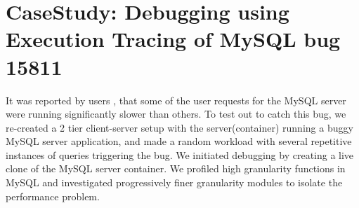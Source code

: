 

\section{CaseStudy: Debugging using Execution Tracing of MySQL bug 15811}  
It was reported by users \cite{mysqlbug}, that some of the user requests for the MySQL server were running significantly slower than others.
To test out \parikshan to catch this bug, we re-created a 2 tier client-server setup with the server(container) running a buggy MySQL server application, and made a random workload with several repetitive instances of queries triggering the bug.
We initiated debugging by creating a live clone of the MySQL server container.
We profiled high granularity functions in MySQL and investigated progressively finer granularity modules to isolate the performance problem.

